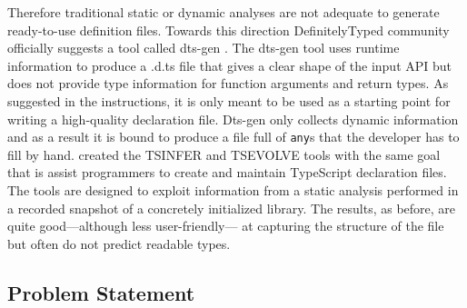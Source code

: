\documentclass[sigplan,10pt,anonymous]{acmart} %
\theoremstyle{plain}
\theoremstyle{remark}
\theoremstyle{definition}
\begin{document}
Therefore traditional static or dynamic analyses are not adequate to generate
ready-to-use definition files. Towards this direction DefinitelyTyped
community officially suggests a tool called dts-gen \citep{dtsgen}. The
dts-gen tool uses runtime information to produce a .d.ts file that gives a
clear shape of the input API but does not provide type information for
function arguments and return types. As
suggested in the instructions, it is only meant to be used as a starting
point for writing a high-quality declaration file. Dts-gen only collects
dynamic information and as a result it is bound to produce a file full of
\texttt{any}s that the developer has to fill by hand. \citet{tstools2017}
created the TSINFER and TSEVOLVE tools with the same goal that is assist
programmers to create and maintain TypeScript declaration files. The tools are
designed to exploit information from a static analysis performed in a
recorded snapshot of a concretely initialized library. The results, as
before, are quite good---although less user-friendly--- at capturing the
structure of the file but often do not predict readable types. 

\subsection{Problem Statement}\label{ssec:problem}
% 


\end{document}
